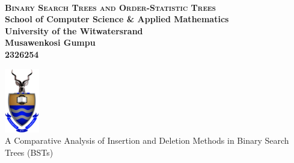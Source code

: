 \documentclass[a4paper,twoside,12pt]{report}
\newenvironment{declaration}{\ \vfill\begin{center}\textbf{Declaration}\end{center}\addcontentsline{toc}{section}{Declaration}}{\vfill\vfill\newpage}
\newenvironment{acknowledgements}{\ \vfill\begin{center}\textbf{Acknowledgements}\end{center}\addcontentsline{toc}{section}{Acknowledgements}}{\vfill\vfill\newpage}
\begin{document}
\onecolumn
\thispagestyle{empty}

\setcounter{page}{0}
\ 
\begin{center}
  \vfill
  {
  \huge \bf \textsc{Binary Search Trees and Order-Statistic Trees}\\
  \large School of Computer Science \& Applied Mathematics\\
  \large University of the Witwatersrand\\[20pt]
  \normalsize
  Musawenkosi Gumpu\\
  2326254\\[20pt]
  \date{3 October 2023}
  }

  \vfill
  \vfill
  \includegraphics[width=1.5cm]{images/wits}
  \vspace{10pt}\\
  \small{A Comparative Analysis of Insertion and Deletion Methods in Binary Search Trees (BSTs)}\\
\end{center}
\vfill
\newpage

\pagestyle{plain}
\setcounter{page}{1}




\end{document}

